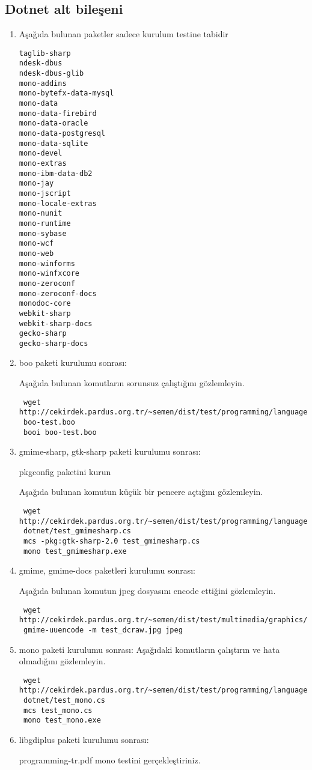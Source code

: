 \documentclass[a4paper,10pt]{article}
\begin{document}
\subsection{Dotnet alt bileşeni}
\begin{enumerate}

\item Aşağıda bulunan paketler sadece kurulum testine tabidir
\begin{verbatim}
taglib-sharp
ndesk-dbus
ndesk-dbus-glib
mono-addins
mono-bytefx-data-mysql
mono-data
mono-data-firebird
mono-data-oracle
mono-data-postgresql
mono-data-sqlite
mono-devel
mono-extras
mono-ibm-data-db2
mono-jay
mono-jscript
mono-locale-extras
mono-nunit
mono-runtime
mono-sybase
mono-wcf
mono-web
mono-winforms
mono-winfxcore
mono-zeroconf
mono-zeroconf-docs
monodoc-core
webkit-sharp
webkit-sharp-docs
gecko-sharp
gecko-sharp-docs
\end{verbatim}

\item boo paketi kurulumu sonrası:

Aşağıda bulunan komutların sorunsuz çalıştığını gözlemleyin.
\begin{verbatim}
 wget http://cekirdek.pardus.org.tr/~semen/dist/test/programming/language/dotnet/
 boo-test.boo
 booi boo-test.boo
\end{verbatim}

 \item gmime-sharp, gtk-sharp paketi kurulumu sonrası:

pkgconfig paketini kurun

Aşağıda bulunan komutun küçük bir pencere açtığını gözlemleyin. 
\begin{verbatim}
 wget http://cekirdek.pardus.org.tr/~semen/dist/test/programming/language/
 dotnet/test_gmimesharp.cs
 mcs -pkg:gtk-sharp-2.0 test_gmimesharp.cs
 mono test_gmimesharp.exe
\end{verbatim}


 \item gmime, gmime-docs paketleri kurulumu sonrası:

Aşağıda bulunan komutun jpeg dosyasını encode ettiğini gözlemleyin.
\begin{verbatim}
 wget http://cekirdek.pardus.org.tr/~semen/dist/test/multimedia/graphics/test_dcraw.jpg
 gmime-uuencode -m test_dcraw.jpg jpeg
\end{verbatim}


 \item mono paketi kurulumu sonrası:
Aşağıdaki komutların çalıştırın ve hata olmadığını gözlemleyin.
\begin{verbatim}
 wget http://cekirdek.pardus.org.tr/~semen/dist/test/programming/language/
 dotnet/test_mono.cs
 mcs test_mono.cs
 mono test_mono.exe
\end{verbatim}

\item libgdiplus paketi kurulumu sonrası:

programming-tr.pdf mono testini gerçekleştiriniz.

\end{enumerate}
\end{document}
